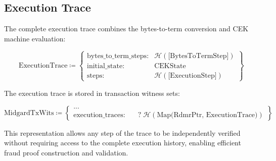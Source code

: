 \documentclass[../midgard.tex]{subfiles}
\begin{document}
\subsection{Execution Trace}

The complete execution trace combines the bytes-to-term conversion and CEK machine evaluation:

\begin{equation*}
    \text{ExecutionTrace} \coloneq \left\{
    \begin{array}{ll}
        \text{bytes\_to\_term\_steps} : & \mathcal{H}(\text{[BytesToTermStep]}) \\
        \text{initial\_state} : & \text{CEKState} \\
        \text{steps} : & \mathcal{H}(\text{[ExecutionStep]})
    \end{array} \right\}
\end{equation*}

The execution trace is stored in transaction witness sets:

\begin{equation*}
    \text{MidgardTxWits} \coloneq \left\{
    \begin{array}{ll}
        ... \\
        \text{execution\_traces} : & \quad?\;\mathcal{H}(\text{Map(RdmrPtr, ExecutionTrace)})
    \end{array} \right\}
\end{equation*}

This representation allows any step of the trace to be independently verified without requiring access to the complete execution history, enabling efficient fraud proof construction and validation.
\end{document}
